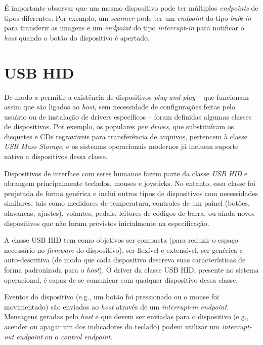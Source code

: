 \documentclass[brazil,pagestart=firstchapter]{abnt}
\makeatletter
\newcommand*{\eg}{e.g.\@\xspace}
\makeatother
\begin{document}
É importante observar que um mesmo dispositivo pode ter múltiplos
\textit{endpoints} de tipos diferentes. Por exemplo, um \textit{scanner}
pode ter um \textit{endpoint} do tipo \textit{bulk-in} para transferir as
imagens e um \textit{endpoint} do tipo \textit{interrupt-in} para notificar
o \textit{host} quando o botão do dispositivo é apertado.


\section{USB HID}
\label{sec:usb_hid}

De modo a permitir a existência de dispositivos \textit{plug-and-play} --
que funcionam assim que são ligados ao \textit{host}, sem necessidade de
configurações feitas pelo usuário ou de instalação de drivers específicos --
foram definidas algumas classes de dispositivos. Por exemplo, os populares
\textit{pen drives}, que substituíram os disquetes e CDs regraváveis para
transferência de arquivos, pertencem à classe \textit{USB Mass Storage}, e
os sistemas operacionais modernos já incluem suporte nativo a dispositivos
dessa classe.

Dispositivos de interface com seres humanos fazem parte da classe
\textit{USB \ac{HID}} e abrangem principalmente teclados, mouses e
joysticks. No entanto, essa classe foi projetada de forma genérica e inclui
outros tipos de dispositivos com necessidades similares, tais como medidores
de temperatura, controles de um painel (botões, alavancas, ajustes),
volantes, pedais, leitores de códigos de barra, ou ainda novos dispositivos
que não foram previstos inicialmente na especificação. \cite[p.~1]{usbhid}

A classe \ac{USB} \ac{HID} tem como objetivos ser compacta (para reduzir o
espaço necessário no \textit{firmware} do dispositivo), ser flexível e
extensível, ser genérica e auto-descritiva (de modo que cada dispositivo
descreva suas características de forma padronizada para o \textit{host}). O
driver da classe \ac{USB} \ac{HID}, presente no sistema operacional, é capaz
de se comunicar com qualquer dispositivo dessa classe. \cite[p.~2]{usbhid}

Eventos do dispositivo (\eg, um botão foi pressionado ou o mouse foi
movimentado) são enviados ao \textit{host} através de um
\textit{interrupt-in endpoint}. Mensagens geradas pelo \textit{host} e que
devem ser enviadas para o dispositivo (\eg, acender ou apagar um dos
indicadores do teclado) podem utilizar um \textit{interrupt-out endpoint} ou
o \textit{control endpoint}. \cite[p.~10]{usbhid}
\end{document}
